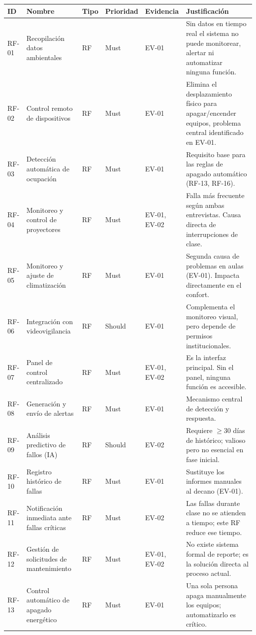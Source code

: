 \begingroup
\small
\begin{longtable}{|P{0.1667}|P{0.1667}|P{0.1667}|P{0.1667}|P{0.1667}|P{0.1667}|}
\hline
ID & Nombre & Tipo & Prioridad & Evidencia & Justificación \\ \hline
RF-01 & Recopilación datos ambientales & RF & Must & EV-01 & Sin datos en tiempo real el sistema no puede monitorear, alertar ni automatizar ninguna función. \\ \hline
RF-02 & Control remoto de dispositivos & RF & Must & EV-01 & Elimina el desplazamiento físico para apagar/encender equipos, problema central identificado en EV-01. \\ \hline
RF-03 & Detección automática de ocupación & RF & Must & EV-01 & Requisito base para las reglas de apagado automático (RF-13, RF-16). \\ \hline
RF-04 & Monitoreo y control de proyectores & RF & Must & EV-01, EV-02 & Falla más frecuente según ambas entrevistas. Causa directa de interrupciones de clase. \\ \hline
RF-05 & Monitoreo y ajuste de climatización & RF & Must & EV-01 & Segunda causa de problemas en aulas (EV-01). Impacta directamente en el confort. \\ \hline
RF-06 & Integración con videovigilancia & RF & Should & EV-01 & Complementa el monitoreo visual, pero depende de permisos institucionales. \\ \hline
RF-07 & Panel de control centralizado & RF & Must & EV-01, EV-02 & Es la interfaz principal. Sin el panel, ninguna función es accesible. \\ \hline
RF-08 & Generación y envío de alertas & RF & Must & EV-01 & Mecanismo central de detección y respuesta. \\ \hline
RF-09 & Análisis predictivo de fallos (IA) & RF & Should & EV-02 & Requiere $\geq$30 días de histórico; valioso pero no esencial en fase inicial. \\ \hline
RF-10 & Registro histórico de fallas & RF & Must & EV-01 & Sustituye los informes manuales al decano (EV-01). \\ \hline
RF-11 & Notificación inmediata ante fallas críticas & RF & Must & EV-02 & Las fallas durante clase no se atienden a tiempo; este RF reduce ese tiempo. \\ \hline
RF-12 & Gestión de solicitudes de mantenimiento & RF & Must & EV-01, EV-02 & No existe sistema formal de reporte; es la solución directa al proceso actual. \\ \hline
RF-13 & Control automático de apagado energético & RF & Must & EV-01 & Una sola persona apaga manualmente los equipos; automatizarlo es crítico. \\ \hline

\end{longtable}
